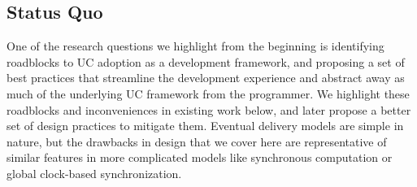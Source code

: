 %

%

\subsection{Status Quo} One of the research questions we highlight from the
beginning is identifying roadblocks to UC adoption as a development framework,
and proposing a set of best practices that streamline the development
experience and abstract away as much of the underlying UC framework from the
programmer.  We highlight these roadblocks and inconveniences in existing work
below, and later propose a better set of design practices to mitigate them.
Eventual delivery models are simple in nature, but the drawbacks in design that
we cover here are representative of similar features in more complicated models
like synchronous computation or global clock-based synchronization.

